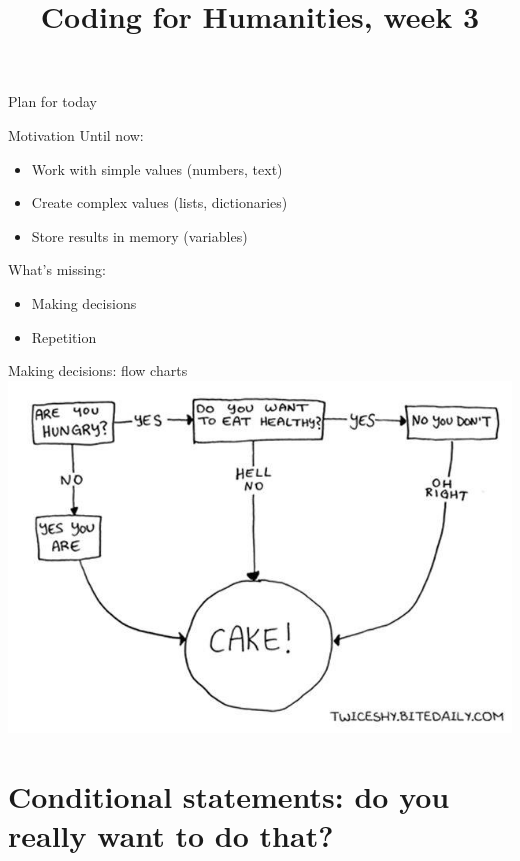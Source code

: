 \documentclass[aspectratio=169,usenames,dvipsnames]{beamer}
\title{Coding for Humanities, week 3}
\begin{document}
\begin{frame}
 \titlepage
\end{frame}

\begin{frame}{Plan for today}
 \tableofcontents
\end{frame}

\begin{frame}{Motivation}
    Until now:
    \begin{itemize}
        \item Work with simple values (numbers, text)
        \item Create complex values (lists, dictionaries)
        \item Store results in memory (variables)
    \end{itemize}

    \pause
    What's missing:
    \begin{itemize}
        \item Making decisions
        \item Repetition
    \end{itemize}
\end{frame}

\begin{frame}{Making decisions: flow charts}
    \includegraphics[height=0.8\textheight]{fig/flowchart}
\end{frame}

\section{Conditional statements: do you really want to do that?}
\frame{\tableofcontents[currentsection]}
\end{document}
